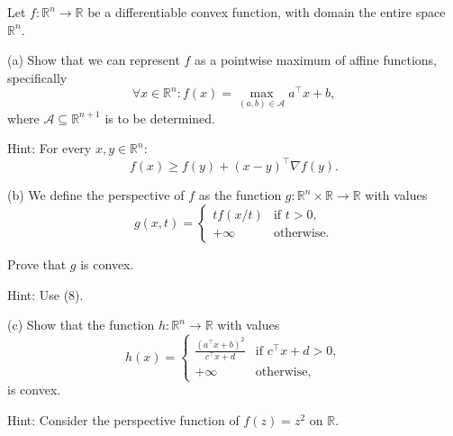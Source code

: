 \documentclass[
  12pt,
]{fphw}
\begin{document}
Let $f : \mathbb{R}^n \to \mathbb{R}$ be a differentiable convex function, with domain the entire space $\mathbb{R}^n$.

(a) Show that we can represent $f$ as a pointwise maximum of affine functions, specifically
\[
\forall x \in \mathbb{R}^n :
f(x) = \max_{(a,b)\in \mathcal{A}} a^\top x + b, \tag{8}
\]
where $\mathcal{A} \subseteq \mathbb{R}^{n+1}$ is to be determined.

Hint: For every $x, y \in \mathbb{R}^n$:
\[
f(x) \ge f(y) + (x-y)^\top \nabla f(y).
\]

(b) We define the perspective of $f$ as the function $g : \mathbb{R}^n \times \mathbb{R} \to \mathbb{R}$ with values
\[
g(x,t) =
\begin{cases}
t f(x/t) & \text{if } t>0, \\
+\infty & \text{otherwise}.
\end{cases}
\]

Prove that $g$ is convex.

Hint: Use (8).

(c) Show that the function $h : \mathbb{R}^n \to \mathbb{R}$ with values
\[
h(x) =
\begin{cases}
\frac{(a^\top x + b)^2}{c^\top x + d} & \text{if } c^\top x + d > 0, \\
+\infty & \text{otherwise},
\end{cases}
\]
is convex.

Hint: Consider the perspective function of $f(z)=z^2$ on $\mathbb{R}$.
\end{document}
